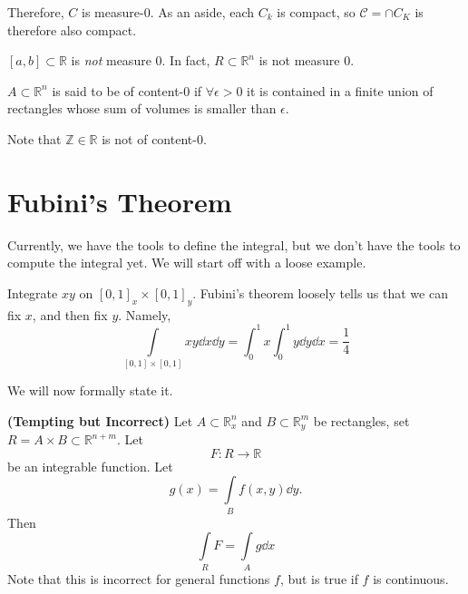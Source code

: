 \documentclass{article}
\begin{document}
Therefore, $C$ is measure-$0$. As an aside, each $C_k$ is compact, so $\mathcal{C} = \cap C_K$ is therefore also compact.
\begin{theorem}
    $[a,b] \subset \mathbb{R}$ is \textit{not} measure $0$. In fact, $R \subset \mathbb{R}^n$ is not measure $0$.
\end{theorem}
\begin{definition}
    $A\subset \mathbb{R}^n$ is said to be of content-$0$ if $\forall \epsilon > 0$ it is contained in a finite union of rectangles whose sum of volumes is smaller than $\epsilon$.
\end{definition}
Note that $\mathbb{Z} \in \mathbb{R}$ is not of content-$0$.

\section{Fubini's Theorem}
Currently, we have the tools to define the integral, but we don't have the tools to compute the integral yet. We will start off with a loose example.
\begin{example}
    Integrate $xy$ on $[0,1]_x \times [0,1]_y.$ Fubini's theorem loosely tells us that we can fix $x$, and then fix $y$. Namely,
    \begin{equation}
        \int\limits_{[0,1]\times [0,1]}xy \dd{x}\dd{y} = \int_0^1 x \int_0^1 y \dd{y}\dd{x} = \frac{1}{4}
    \end{equation}
\end{example}
We will now formally state it.
\begin{theorem}
    \textbf{(Tempting but Incorrect)} Let $A\subset \mathbb{R}_x^n$ and $B\subset \mathbb{R}_y^m$ be rectangles, set $R=A\times B \subset \mathbb{R}^{n+m}.$ Let
    \begin{equation}
        F:R \rightarrow \mathbb{R}
    \end{equation}
    be an integrable function. Let
    \begin{equation}
        g(x) = \int\limits_{B} f(x,y) \dd{y}.
    \end{equation}
    Then
    \begin{equation}
        \int\limits_R F =  \int\limits_A g \dd{x}
    \end{equation}
    Note that this is incorrect for general functions $f$, but is true if $f$ is continuous.
\end{theorem}
\end{document}
